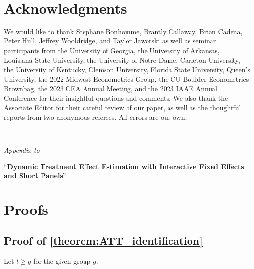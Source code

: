 \documentclass[12pt]{article}
\begin{document}
\newpage~\section*{Acknowledgments}

We would like to thank Stephane Bonhomme, Brantly Callaway, Brian Cadena, Peter Hull, Jeffrey Wooldridge, and Taylor Jaworski as well as seminar participants from the University of Georgia, the University of Arkansas, Louisiana State University, the University of Notre Dame, Carleton University, the University of Kentucky, Clemson University, Florida State University, Queen's University, the 2022 Midwest Econometrics Group, the CU Boulder Econometrics Brownbag, the 2023 CEA Annual Meeting, and the 2023 IAAE Annual Conference for their insightful questions and comments. We also thank the Associate Editor for their careful review of our paper, as well as the thoughtful reports from two anonymous referees. All errors are our own.


\newpage~\appendix

\begin{center}
    \emph{Appendix to}
    
    {\large ``\textbf{Dynamic Treatment Effect Estimation with Interactive Fixed Effects and Short Panels}''}
\end{center}

\section{Proofs}\label{sec:proofs}



\subsection*{Proof of \autoref{theorem:ATT_identification}}

Let $t \geq g$ for the given group $g$.
\end{document}
